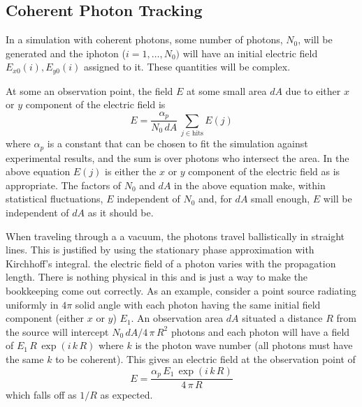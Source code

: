 \subsection{Coherent Photon Tracking}

In a simulation with coherent photons, some number of photons,
$N_0$, will be generated and the i\Th photon ($i = 1, \ldots, N_0)$
will have an initial electric field $E_{x0}(i), E_{y0}(i)$ assigned to
it. These quantities will be complex.

At some an observation point, the field $E$ at
some small area $dA$ due to either $x$ or $y$ component of the
electric field is
\begin{equation}
  E = \frac{\alpha_p}{N_0 \, dA} \, \sum_{j \in \text{hits}} E(j)
  \label{panda2}
\end{equation}
where $\alpha_p$ is a constant that can be chosen to fit the
simulation against experimental results, and the sum is over photons
who intersect the area. In the above equation $E(j)$ is either the $x$
or $y$ component of the electric field as is appropriate. The factors
of $N_0$ and $dA$ in the above equation make, within statistical
fluctuations, $E$ independent of $N_0$ and, for $dA$ small enough, $E$
will be independent of $dA$ as it should be.

When traveling through a a vacuum, the photons travel ballistically in
straight lines. This is justified by using the stationary phase
approximation with Kirchhoff's integral. the electric field of a
photon varies with the propagation length. There is nothing physical
in this and is just a way to make the bookkeeping come out
correctly. As an example, consider a point source radiating uniformly
in $4\pi$ solid angle with each photon having the same initial field
component (either $x$ or $y$) $E_1$.  An observation area $dA$
situated a distance $R$ from the source will intercept $N_0 \, dA / 4
\, \pi \, R^2$ photons and each photon will have a field of $E_1 \, R
\, \exp(i \, k \, R)$ where $k$ is the photon wave number (all photons
must have the same $k$ to be coherent). This gives an electric field
at the observation point of
\begin{equation}
  E = \frac{\alpha_p \, E_1 \, \exp(i \, k \, R)}{4 \, \pi \, R}
\end{equation}
which falls off as $1/R$ as expected.

